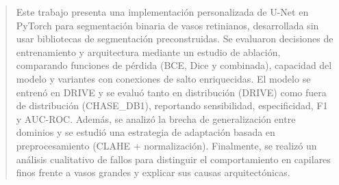 \begin{abstract}
Este trabajo presenta una implementación personalizada de U-Net en PyTorch para segmentación binaria de vasos retinianos, desarrollada sin usar bibliotecas de segmentación preconstruidas. Se evaluaron decisiones de entrenamiento y arquitectura mediante un estudio de ablación, comparando funciones de pérdida (BCE, Dice y combinada), capacidad del modelo y variantes con conexiones de salto enriquecidas. El modelo se entrenó en DRIVE y se evaluó tanto en distribución (DRIVE) como fuera de distribución (CHASE\_DB1), reportando sensibilidad, especificidad, F1 y AUC-ROC. Además, se analizó la brecha de generalización entre dominios y se estudió una estrategia de adaptación basada en preprocesamiento (CLAHE + normalización). Finalmente, se realizó un análisis cualitativo de fallos para distinguir el comportamiento en capilares finos frente a vasos grandes y explicar sus causas arquitectónicas.
\end{abstract}
